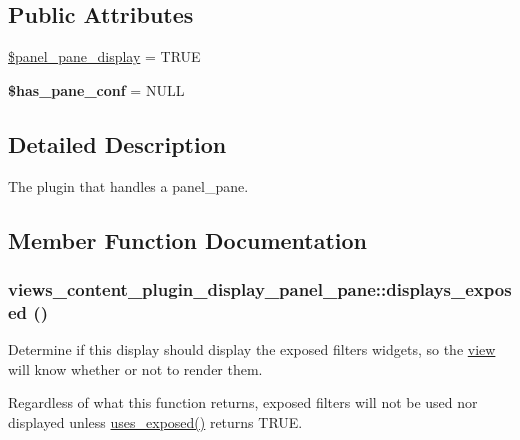 \subsection*{Public Attributes}
\begin{DoxyCompactItemize}
\item 
\hyperlink{classviews__content__plugin__display__panel__pane_a9a83e16864538a66009798e8d43e8064}{\$panel\_\-pane\_\-display} = TRUE
\item 
\hypertarget{classviews__content__plugin__display__panel__pane_a969e9db04c1bf591d2e903c8c3fc805b}{
{\bfseries \$has\_\-pane\_\-conf} = NULL}
\label{classviews__content__plugin__display__panel__pane_a969e9db04c1bf591d2e903c8c3fc805b}

\end{DoxyCompactItemize}


\subsection{Detailed Description}
The plugin that handles a panel\_\-pane. 

\subsection{Member Function Documentation}
\hypertarget{classviews__content__plugin__display__panel__pane_a4e8cffaa9d5573babc19db650702e07f}{
\subsubsection[{displays\_\-exposed}]{\setlength{\rightskip}{0pt plus 5cm}views\_\-content\_\-plugin\_\-display\_\-panel\_\-pane::displays\_\-exposed ()}}
\label{classviews__content__plugin__display__panel__pane_a4e8cffaa9d5573babc19db650702e07f}
Determine if this display should display the exposed filters widgets, so the \hyperlink{classview}{view} will know whether or not to render them.

Regardless of what this function returns, exposed filters will not be used nor displayed unless \hyperlink{classviews__plugin__display_a5bfcb22187618f52bea9ea626aff18a4}{uses\_\-exposed()} returns TRUE. 

